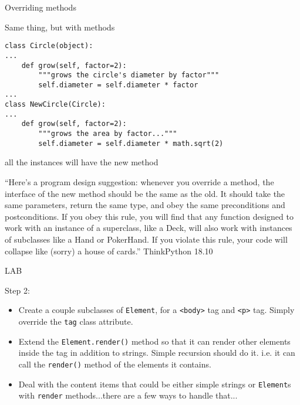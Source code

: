 \documentclass{beamer}
\begin{document}
\begin{frame}[fragile]{Overriding methods}

{\Large Same thing, but with methods}

\vfill
\begin{verbatim}
class Circle(object):
...
    def grow(self, factor=2):
        """grows the circle's diameter by factor"""
        self.diameter = self.diameter * factor
...
class NewCircle(Circle):
...
    def grow(self, factor=2):
        """grows the area by factor..."""
        self.diameter = self.diameter * math.sqrt(2)
\end{verbatim}
all the instances will have the new method
\end{frame} 

\begin{frame}

{\Large
``Here's a program design suggestion: whenever you override a method, the
interface of the new method should be the same as the old.  It should take
the same parameters, return the same type, and obey the same preconditions
and postconditions.  If you obey this rule, you will find that any function
designed to work with an instance of a superclass, like a Deck, will also work
with instances of subclasses like a Hand or PokerHand.  If you violate this
rule, your code will collapse like (sorry) a house of cards.''
}
\vfill
\hfill ThinkPython 18.10
\end{frame}

\begin{frame}[fragile]{LAB}

\vfill
{\Large Step 2:}

\begin{itemize}
  \item  Create a couple subclasses of \verb|Element|, for a \verb|<body>| tag
         and \verb|<p>| tag. Simply override the \verb|tag| class attribute.
  \item Extend the \verb|Element.render()| method so that it can render other
        elements inside the tag in addition to strings. Simple recursion should
        do it. i.e. it can call the \verb|render()| method of the elements it
        contains.
  \item Deal with the content items that could be either simple strings or
        \verb|Element|s with \verb|render| methods...there are a few ways to handle that...
\end{itemize}

\end{frame}
\end{document}
